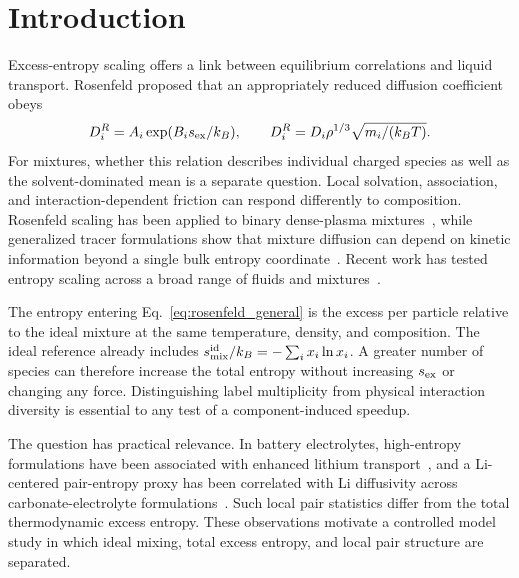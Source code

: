 \documentclass[aps,pre,twocolumn,superscriptaddress,floatfix]{revtex4-2}
\begin{document}
\section{Introduction}

Excess-entropy scaling offers a link between equilibrium correlations and liquid transport. Rosenfeld proposed that an appropriately reduced diffusion coefficient obeys~\cite{Rosenfeld1977,Rosenfeld1999}
\begin{equation}
D_i^R=A_i\exp(B_i s_{\rm ex}/k_B),\qquad
D_i^R=D_i\rho^{1/3}\sqrt{m_i/(k_BT)}.
\label{eq:rosenfeld_general}
\end{equation}
For mixtures, whether this relation describes individual charged species as well as the solvent-dominated mean is a separate question. Local solvation, association, and interaction-dependent friction can respond differently to composition. Rosenfeld scaling has been applied to binary dense-plasma mixtures~\cite{Rosenfeld1995}, while generalized tracer formulations show that mixture diffusion can depend on kinetic information beyond a single bulk entropy coordinate~\cite{Krekelberg2009}. Recent work has tested entropy scaling across a broad range of fluids and mixtures~\cite{Schmitt2025}.

The entropy entering Eq.~\eqref{eq:rosenfeld_general} is the excess per particle relative to the ideal mixture at the same temperature, density, and composition. The ideal reference already includes $s_{\rm mix}^{\rm id}/k_B=-\sum_i x_i\ln x_i$. A greater number of species can therefore increase the total entropy without increasing $s_{\rm ex}$ or changing any force. Distinguishing label multiplicity from physical interaction diversity is essential to any test of a component-induced speedup.

The question has practical relevance. In battery electrolytes, high-entropy formulations have been associated with enhanced lithium transport~\cite{Wang2023}, and a Li-centered pair-entropy proxy has been correlated with Li diffusivity across carbonate-electrolyte formulations~\cite{He2026}. Such local pair statistics differ from the total thermodynamic excess entropy. These observations motivate a controlled model study in which ideal mixing, total excess entropy, and local pair structure are separated.
\end{document}
